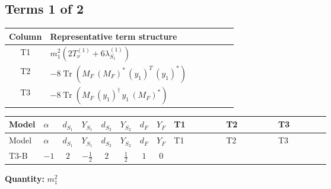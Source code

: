 \documentclass[8pt]{article}
\begin{document}
\begin{landscape}
\subsection*{Terms 1 of 2}
\begin{center}
\begin{tabular}{@{}c >{\raggedright\arraybackslash}p{0.82\linewidth}@{}}
\toprule
Column & Representative term structure \\
\midrule
T1 & \(\displaystyle {m_1^2} (2 T_{\nu}^{(1)}+6 {\lambda_{S_1}^{(1)}})\) \\
\midrule
T2 & \(\displaystyle -8 \operatorname{Tr}\!\left({M_F}\,\left({M_F}\right)^{*}\,\left({y_1}\right)^{T}\,\left({y_1}\right)^{*}\right)\) \\
\midrule
T3 & \(\displaystyle -8 \operatorname{Tr}\!\left({M_F}\,\left({y_1}\right)^{\dagger}\,{y_1}\,\left({M_F}\right)^{*}\right)\) \\
\midrule
\bottomrule
\end{tabular}
\end{center}
\smallskip
\tiny
\begin{longtable}{@{}llcccccc >{\raggedright\arraybackslash}p{0.21\linewidth} >{\raggedright\arraybackslash}p{0.21\linewidth} >{\raggedright\arraybackslash}p{0.21\linewidth}@{}}
\toprule
Model & $\alpha$ & $d_{S_1}$ & $Y_{S_1}$ & $d_{S_2}$ & $Y_{S_2}$ & $d_F$ & $Y_F$ & T1 & T2 & T3 \\
\midrule
\endfirsthead
\toprule
Model & $\alpha$ & $d_{S_1}$ & $Y_{S_1}$ & $d_{S_2}$ & $Y_{S_2}$ & $d_F$ & $Y_F$ & T1 & T2 & T3 \\
\midrule
\endhead
T3-B & $-1$ & $2$ & $-\frac{1}{2}$ & $2$ & $\frac{1}{2}$ & $1$ & $0$ & \scriptsize\adjustbox{max width=\linewidth}{$\begin{gathered} {m_1^2} (2 T_{\nu}^{(1)}+6 {\lambda_{S_1}^{(1)}})\end{gathered}$} & \scriptsize\adjustbox{max width=\linewidth}{$\begin{gathered} -8 \operatorname{Tr}\!\left({M_F}\,\left({M_F}\right)^{*}\,\left({y_1}\right)^{T}\,\left({y_1}\right)^{*}\right)\end{gathered}$} & \scriptsize\adjustbox{max width=\linewidth}{$\begin{gathered} -8 \operatorname{Tr}\!\left({M_F}\,\left({y_1}\right)^{\dagger}\,{y_1}\,\left({M_F}\right)^{*}\right)\end{gathered}$} \\
\midrule
\bottomrule
\end{longtable}
\clearpage
\noindent\textbf{Quantity: }$m_1^2$\par\smallskip

\end{landscape}
\end{document}
